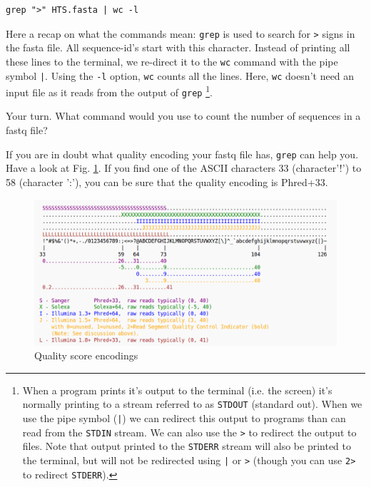 \documentclass[11pt]{article}
\begin{document}
\begin{verbatim}
grep ">" HTS.fasta | wc -l
\end{verbatim}

Here a recap on what the commands mean: \texttt{grep} is used to search for
\texttt{>} signs in the fasta file. All sequence-id's start with this
character. Instead of printing all these lines to the terminal, we
re-direct it to the \texttt{wc} command with the pipe symbol \texttt{|}. Using the
\texttt{-l} option, \texttt{wc} counts all the lines. Here, \texttt{wc} doesn't need an
input file as it reads from the output of \texttt{grep} \footnote{When a program prints it's output to the terminal (i.e. the
screen) it's normally printing to a stream referred to as \texttt{STDOUT}
(standard out). When we use the pipe symbol (\texttt{|}) we can redirect this
output to programs than can read from the \texttt{STDIN} stream. We can also
use the \texttt{>} to redirect the output to files. Note that output printed
to the \texttt{STDERR} stream will also be printed to the terminal, but will
not be redirected using \texttt{|} or \texttt{>} (though you can use \texttt{2>} to
redirect \texttt{STDERR}).}.


Your turn. What command would you use to count the number of sequences
in a fastq file?

If you are in doubt what quality encoding your fastq file has, \texttt{grep}
can help you. Have a look at Fig. \ref{fig:orgparagraph4}. If you find one of the ASCII
characters 33 (character'!') to 58 (character ':'), you can be sure
that the quality encoding is Phred+33. 


\begin{figure}[htb]
\centering
\includegraphics[width=14cm]{Fastq.png}
\caption{\label{fig:orgparagraph4}
Quality score encodings}
\end{figure}
\end{document}
